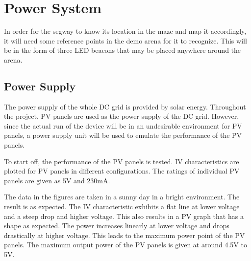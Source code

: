 \section{Power System}
In order for the segway to know its location in the maze and map it accordingly, it will need some reference points in the demo arena for it to recognize. This will be in the form of three LED beacons that may be placed anywhere around the arena.

\subsection{Power Supply}
The power supply of the whole DC grid is provided by solar energy. Throughout the project, PV panels are used as the power supply of the DC grid. However, since the actual run of the device will be in an undesirable environment for PV panels, a power supply unit will be used to emulate the performance of the PV panels.

To start off, the performance of the PV panels is tested. IV characteristics are plotted for PV panels in different configurations. The ratings of individual PV panels are given as 5V and 230mA.

The data in the figures are taken in a sunny day in a bright environment. The result is as expected. The IV characteristic exhibits a flat line at lower voltage and a steep drop and higher voltage. This also results in a PV graph that has a shape as expected. The power increases linearly at lower voltage and drops drastically at higher voltage. This leads to the maximum power point of the PV panels. The maximum output power of the PV panels is given at around 4.5V to 5V.

